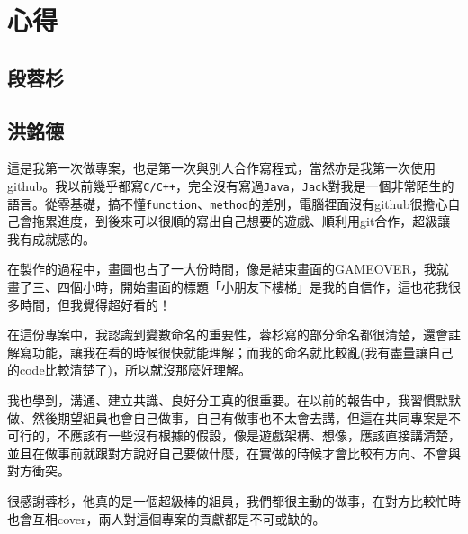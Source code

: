 \documentclass[12pt,a4paper]{article}
\begin{document}
\section{心得}
\subsection{段蓉杉}


\subsection{洪銘德}
這是我第一次做專案，也是第一次與別人合作寫程式，當然亦是我第一次使用github。我以前幾乎都寫\texttt{C/C++}，完全沒有寫過\texttt{Java}，\texttt{Jack}對我是一個非常陌生的語言。從零基礎，搞不懂\texttt{function}、\texttt{method}的差別，電腦裡面沒有github很擔心自己會拖累進度，到後來可以很順的寫出自己想要的遊戲、順利用git合作，超級讓我有成就感的。

在製作的過程中，畫圖也占了一大份時間，像是結束畫面的GAMEOVER，我就畫了三、四個小時，開始畫面的標題「小朋友下樓梯」是我的自信作，這也花我很多時間，但我覺得超好看的！

在這份專案中，我認識到變數命名的重要性，蓉杉寫的部分命名都很清楚，還會註解寫功能，讓我在看的時候很快就能理解；而我的命名就比較亂(我有盡量讓自己的code比較清楚了)，所以就沒那麼好理解。

我也學到，溝通、建立共識、良好分工真的很重要。在以前的報告中，我習慣默默做、然後期望組員也會自己做事，自己有做事也不太會去講，但這在共同專案是不可行的，不應該有一些沒有根據的假設，像是遊戲架構、想像，應該直接講清楚，並且在做事前就跟對方說好自己要做什麼，在實做的時候才會比較有方向、不會與對方衝突。

很感謝蓉杉，他真的是一個超級棒的組員，我們都很主動的做事，在對方比較忙時也會互相cover，兩人對這個專案的貢獻都是不可或缺的。

\newpage
\end{document}
